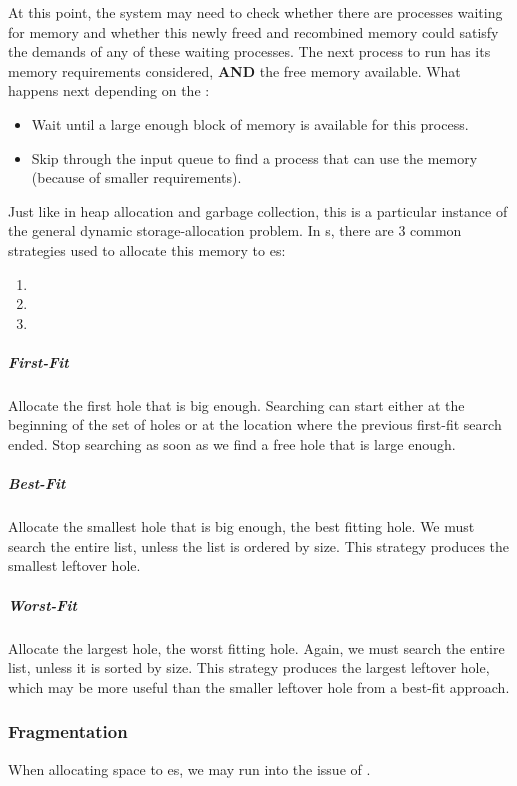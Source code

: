 At this point, the system may need to check whether there are processes waiting for memory and whether this newly freed and recombined memory could satisfy the demands of any of these waiting processes.
The next process to run has its memory requirements considered, \textbf{AND} the free memory available.
What happens next depending on the :
\begin{itemize}[noitemsep]
\item Wait until a large enough block of memory is available for this process.
\item Skip through the input queue to find a process that can use the memory (because of smaller requirements).
\end{itemize}

Just like in heap allocation and garbage collection, this is a particular instance of the general dynamic storage-allocation problem.
In s, there are 3 common strategies used to allocate this memory to es:
\begin{enumerate}[noitemsep]
\item {}
\item {}
\item {}
\end{enumerate}

\subparagraph{First-Fit}\label{subpar:First_Fit}
Allocate the first hole that is big enough.
Searching can start either at the beginning of the set of holes or at the location where the previous first-fit search ended.
Stop searching as soon as we find a free hole that is large enough.

\subparagraph{Best-Fit}\label{subpar:Best_Fit}
Allocate the smallest hole that is big enough, the best fitting hole.
We must search the entire list, unless the list is ordered by size.
This strategy produces the smallest leftover hole.

\subparagraph{Worst-Fit}\label{subpar:Worst_Fit}
Allocate the largest hole, the worst fitting hole.
Again, we must search the entire list, unless it is sorted by size.
This strategy produces the largest leftover hole, which may be more useful than the smaller leftover hole from a best-fit approach.

\subsubsection{Fragmentation}\label{subsubsec:Contiguous_Memory_Fragmentation}
When allocating space to es, we may run into the issue of .

